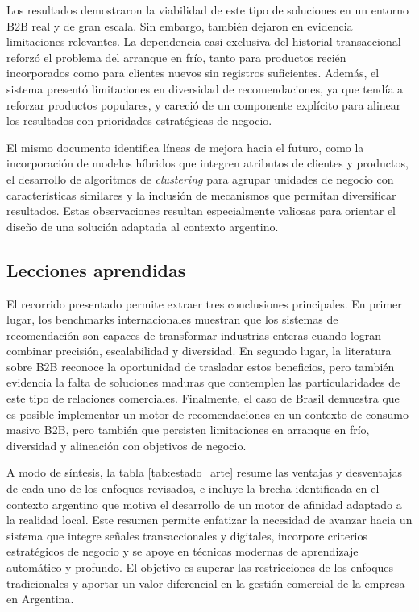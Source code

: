 Los resultados demostraron la viabilidad de este tipo de soluciones en un entorno B2B real y de gran escala. Sin embargo, también dejaron en evidencia limitaciones relevantes. La dependencia casi exclusiva del historial transaccional reforzó el problema del arranque en frío, tanto para productos recién incorporados como para clientes nuevos sin registros suficientes. Además, el sistema presentó limitaciones en diversidad de recomendaciones, ya que tendía a reforzar productos populares, y careció de un componente explícito para alinear los resultados con prioridades estratégicas de negocio.

El mismo documento identifica líneas de mejora hacia el futuro, como la incorporación de modelos híbridos que integren atributos de clientes y productos, el desarrollo de algoritmos de \textit{clustering} para agrupar unidades de negocio con características similares y la inclusión de mecanismos que permitan diversificar resultados. Estas observaciones resultan especialmente valiosas para orientar el diseño de una solución adaptada al contexto argentino.

\subsection{Lecciones aprendidas}

El recorrido presentado permite extraer tres conclusiones principales. En primer lugar, los benchmarks internacionales muestran que los sistemas de recomendación son capaces de transformar industrias enteras cuando logran combinar precisión, escalabilidad y diversidad. En segundo lugar, la literatura sobre B2B reconoce la oportunidad de trasladar estos beneficios, pero también evidencia la falta de soluciones maduras que contemplen las particularidades de este tipo de relaciones comerciales. Finalmente, el caso de Brasil demuestra que es posible implementar un motor de recomendaciones en un contexto de consumo masivo B2B, pero también que persisten limitaciones en arranque en frío, diversidad y alineación con objetivos de negocio.

A modo de síntesis, la tabla \ref{tab:estado_arte} resume las ventajas y desventajas de cada uno de los enfoques revisados, e incluye la brecha identificada en el contexto argentino que motiva el desarrollo de un motor de afinidad adaptado a la realidad local. Este resumen permite enfatizar la necesidad de avanzar hacia un sistema que integre señales transaccionales y digitales, incorpore criterios estratégicos de negocio y se apoye en técnicas modernas de aprendizaje automático y profundo. El objetivo es superar las restricciones de los enfoques tradicionales y aportar un valor diferencial en la gestión comercial de la empresa en Argentina.

